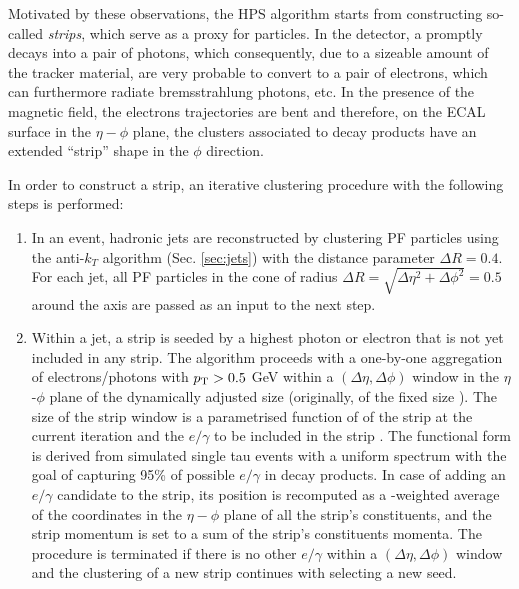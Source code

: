 Motivated by these observations, the HPS algorithm starts from constructing so-called \textit{strips}, which serve as a proxy for \piz particles. In the detector, a \piz promptly decays into a pair of photons, which consequently, due to a sizeable amount of the tracker material, are very probable to convert to a pair of electrons, which can furthermore radiate bremsstrahlung photons, etc. In the presence of the magnetic field, the electrons trajectories are bent and therefore, on the ECAL surface in the $\eta-\phi$ plane, the clusters associated to \piz decay products have an extended \enquote{strip} shape in the $\phi$ direction.

In order to construct a strip, an iterative clustering procedure with the following steps is performed:

\begin{enumerate}
    \item In an event, hadronic jets are reconstructed by clustering PF particles using the anti-$k_T$ algorithm \cite{Cacciari:2008gp} (Sec. \ref{sec:jets}) with the distance parameter $\Delta R = 0.4$. For each jet, all PF particles in the cone of radius $\Delta R = \sqrt{\Delta \eta^2 + \Delta  \phi^2} = 0.5$ around the axis are passed as an input to the next step. 
    \item Within a jet, a strip is seeded by a highest \pt photon or electron that is not yet included in any strip. The algorithm proceeds with a one-by-one aggregation of electrons/photons with $p_{\text{T}} > 0.5$ GeV within a $(\Delta \eta, \Delta  \phi)$ window in the $\eta$-$\phi$ plane of the dynamically adjusted size (originally, of the fixed size \cite{CMS:2015pac}). The size of the strip window is a parametrised function of \pt of the strip at the current iteration and the $e/\gamma$ to be included in the strip \cite{CMS:2018jrd}. The functional form is derived from simulated single tau events with a uniform \pt spectrum with the goal of capturing 95\% of possible $e/\gamma$ in \tauh decay products. In case of adding an $e/\gamma$ candidate to the strip, its position is recomputed as a \pt-weighted average of the coordinates in the $\eta-\phi$ plane of all the strip's constituents, and the strip momentum is set to a sum of the strip's constituents momenta. The procedure is terminated if there is no other $e/\gamma$ within a $(\Delta \eta, \Delta  \phi)$ window and the clustering of a new strip continues with selecting a new seed.

\end{enumerate}
